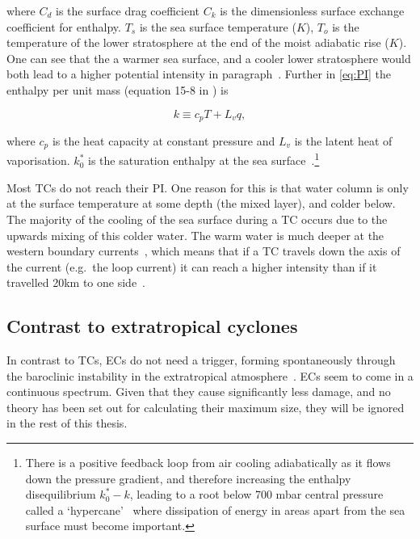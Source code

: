 where $C_d$ is the surface drag coefficient $C_k$ is the dimensionless
surface exchange coefficient for enthalpy.
$T_s$ is the sea surface temperature ($K$), $T_o$ is the temperature of the
lower stratosphere at the end of the moist adiabatic rise ($K$).
One can see that the a warmer sea surface, and a cooler lower stratosphere
would both lead to a higher potential intensity in paragraph~\cite{emanuel1991theory, emanuel2018progress}.
Further in \ref{eq:PI} the enthalpy per unit mass (equation 15-8 in \cite{emanuel2018progress}) is


\begin{equation}
k \equiv c_{p} T+L_{v} q,
\label{eq:enthalpy_per_unit_mass}
\end{equation}



where $c_p$ is the heat capacity at constant pressure and $L_{v}$ is the latent heat
of vaporisation. $k_{0}^{*}$ is the saturation enthalpy at the sea
surface~\cite{emanuel2018progress}.\footnote{
There is a positive feedback loop from air cooling adiabatically as it flows down
the pressure gradient, and therefore increasing the enthalpy disequilibrium
$k_{0}^{*}-k$, leading to a root below 700 mbar central pressure called a `hypercane'~\cite{emanuel1987dependence}
where dissipation of energy in areas apart from the sea surface must become important.

}





Most TCs do not reach their PI.
One reason for this is that
water column is only at the surface temperature
at some depth (the mixed layer), and colder below.
The majority of the cooling of
the sea surface during a TC occurs due to the
upwards mixing of this colder water.
The warm water
is much deeper at the western boundary currents~\cite{hogg1995western},
which means that if a TC
travels down the axis of the current (e.g.~the loop current)
it can reach a higher intensity than
if it travelled 20km to one side~\cite{emanuel2005divine}.


\subsection{Contrast to extratropical cyclones}
In contrast to TCs,  ECs do not need a trigger, forming
spontaneously through the baroclinic instability
in the extratropical atmosphere~\cite{lorenz1960energy}.
ECs seem to come in a continuous spectrum.
Given that they cause
significantly less damage, and no theory has been
 set out for calculating their maximum size,
they will be ignored in the rest of this thesis.
